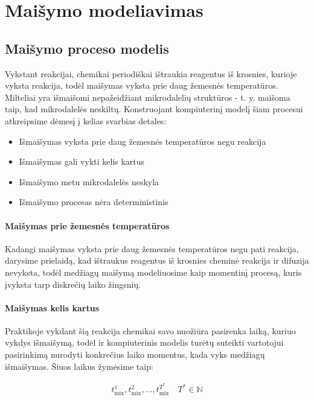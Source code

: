 
\section{Maišymo modeliavimas}
\subsection{Maišymo proceso modelis}

Vykstant reakcijai, chemikai periodiškai ištraukia reagentus iš krosnies, kurioje vyksta reakcija, todėl maišymas vyksta prie daug žemesnės temperatūros. Milteliai yra išmaišomi nepažeidžiant mikrodalelių struktūros - t. y. maišoma taip, kad mikrodalelės neskiltų. Konstruojant kompiuterinį modelį šiam procesui atkreipsime dėmesį į kelias svarbias detales:

\begin{itemize}
    \item Išmaišymas vyksta prie daug žemesnės temperatūros negu reakcija
    \item Išmaišymas gali vykti kelis kartus
    \item Išmaišymo metu mikrodalelės neskyla
    \item Išmaišymo procesas nėra deterministinis
\end{itemize}

\paragraph{Maišymas prie žemesnės temperatūros}

Kadangi maišymas vyksta prie daug žemesnės temperatūros negu pati reakcija, darysime prielaidą, kad ištraukus reagentus iš krosnies cheminė reakcija ir difuzija nevyksta, todėl medžiagų maišymą modeliuosime kaip momentinį procesą, kuris įvyksta tarp diskrečių laiko žingsnių.

\paragraph{Maišymas kelis kartus}

Praktikoje vykdant šią reakcija chemikai savo nuožiūra pasirenka laiką, kuriuo vykdys išmaišymą, todėl ir kompiuterinis modelis turėtų suteikti vartotojui pasirinkimą nurodyti konkrečius laiko momentus, kada vyks medžiagų išmaišymas. Šiuos laikus žymėsime taip:

\begin{align}
    t^1_\text{mix}, t^2_\text{mix}, \dots, t^{T^*}_\text{mix} \quad T^*\in \mathbb{N}
\end{align}

